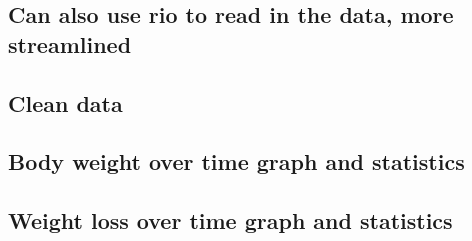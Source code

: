 \documentclass[
]{book}
\newenvironment{Shaded}{\begin{snugshade}}{\end{snugshade}}
\newcommand{\CommentTok}[1]{\textcolor[rgb]{0.56,0.35,0.01}{\textit{#1}}}
\newcommand{\FunctionTok}[1]{\textcolor[rgb]{0.00,0.00,0.00}{#1}}
\newcommand{\NormalTok}[1]{#1}
\newcommand{\OtherTok}[1]{\textcolor[rgb]{0.56,0.35,0.01}{#1}}
\newcommand{\SpecialCharTok}[1]{\textcolor[rgb]{0.00,0.00,0.00}{#1}}
\newcommand{\StringTok}[1]{\textcolor[rgb]{0.31,0.60,0.02}{#1}}
\begin{document}
\hypertarget{can-also-use-rio-to-read-in-the-data-more-streamlined}{%
\subsection{Can also use rio to read in the data, more streamlined}\label{can-also-use-rio-to-read-in-the-data-more-streamlined}}

\hypertarget{clean-data}{%
\subsection{Clean data}\label{clean-data}}

\begin{Shaded}
\end{Shaded}

\begin{Shaded}
\end{Shaded}

\hypertarget{body-weight-over-time-graph-and-statistics}{%
\subsection{Body weight over time graph and statistics}\label{body-weight-over-time-graph-and-statistics}}

\hypertarget{weight-loss-over-time-graph-and-statistics}{%
\subsection{Weight loss over time graph and statistics}\label{weight-loss-over-time-graph-and-statistics}}
\end{document}
